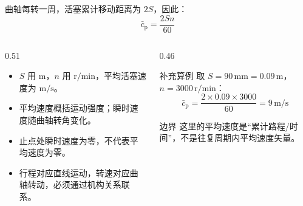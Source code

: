 \begin{frame}[t,shrink]{}
曲轴每转一周，活塞累计移动距离为 \(2S\)，因此：
$$
\bar c_{\mathrm{p}}=\frac{2Sn}{60}
$$
\begin{columns}[T,onlytextwidth]
\begin{column}{0.51\textwidth}
  \begin{itemize}
    \item \(S\) 用 \(\mathrm{m}\)，\(n\) 用 \(\mathrm{r/min}\)，平均活塞速度为 \(\mathrm{m/s}\)。
    \item 平均速度概括运动强度；瞬时速度随曲轴转角变化。
    \item 止点处瞬时速度为零，不代表平均速度为零。
    \item 行程对应直线运动，转速对应曲轴转动，必须通过机构关系联系。
  \end{itemize}
\end{column}
\begin{column}{0.46\textwidth}
  \begin{keybox}{补充算例}
  \small 取 \(S=90\,\mathrm{mm}=0.09\,\mathrm{m}\)，\(n=3000\,\mathrm{r/min}\)：
  $$
  \bar c_{\mathrm{p}}=\frac{2\times0.09\times3000}{60}=9\,\mathrm{m/s}
  $$
  \end{keybox}
  \vspace{0.6mm}
  \begin{amberbox}{边界}
  \small 这里的平均速度是“累计路程/时间”，不是往复周期内平均速度矢量。
  \end{amberbox}
\end{column}
\end{columns}
\end{frame}


